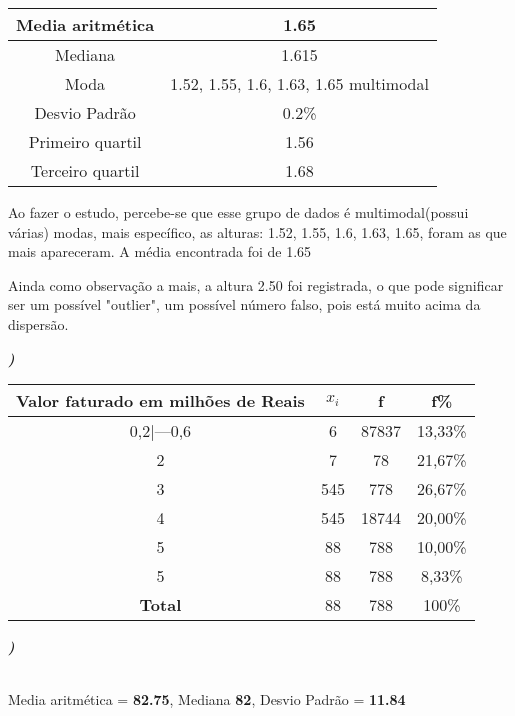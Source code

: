 \documentclass[12pt]{article}
\newcounter{instn}
\newcommand{\instnum}{\arabic{instn}}
\newcommand{\myline}[1]{
    \emph{\textbf{#1)}}
    \addtocounter{instn}{1}
}
\begin{document}
    \begin{center}
        \begin{tabular}{|c | c |} 
        \hline
        Media aritmética & 1.65 \\ 
        \hline
        Mediana & 1.615 \\ 
        \hline
        Moda & 1.52, 1.55, 1.6, 1.63, 1.65 multimodal \\ 
        \hline
        Desvio Padrão & 0.2\% \\ 
        \hline
        Primeiro quartil & 1.56 \\ 
        \hline
        Terceiro quartil & 1.68 \\ 
        \hline
       \end{tabular}
    \end{center}

    Ao fazer o estudo, percebe-se que esse grupo de dados é multimodal(possui várias)
    modas, mais específico, as alturas: 1.52, 1.55, 1.6, 1.63, 1.65, foram as que mais apareceram.
    A média encontrada foi de 1.65

    Ainda como observação a mais, a altura 2.50 foi registrada, o que pode significar ser um possível
    "outlier", um possível número falso, pois está muito acima da dispersão.


    \myline{\instnum}

    \begin{center}
        \begin{tabular}{|c | c | c | c|} 
        \hline
        Valor faturado em milhões de Reais & $x_i$ & f & f\% \\ [3pt]
        \hline
        0,2|---0,6 & 6 & 87837 & 13,33\% \\ 
        \hline
        2 & 7 & 78 & 21,67\% \\
        \hline
        3 & 545 & 778 & 26,67\% \\
        \hline
        4 & 545 & 18744 & 20,00\% \\
        \hline
        5 & 88 & 788 & 10,00\% \\ 
        \hline
        5 & 88 & 788 & 8,33\% \\ 
        \hline
        \textbf{Total} & 88 & 788 & 100\% \\ [3pt]
        \hline
       \end{tabular}
    \end{center}

    \myline{\instnum} \\ Media aritmética = \textbf{82.75}, Mediana \textbf{82}, Desvio Padrão = \textbf{11.84}
\end{document}
